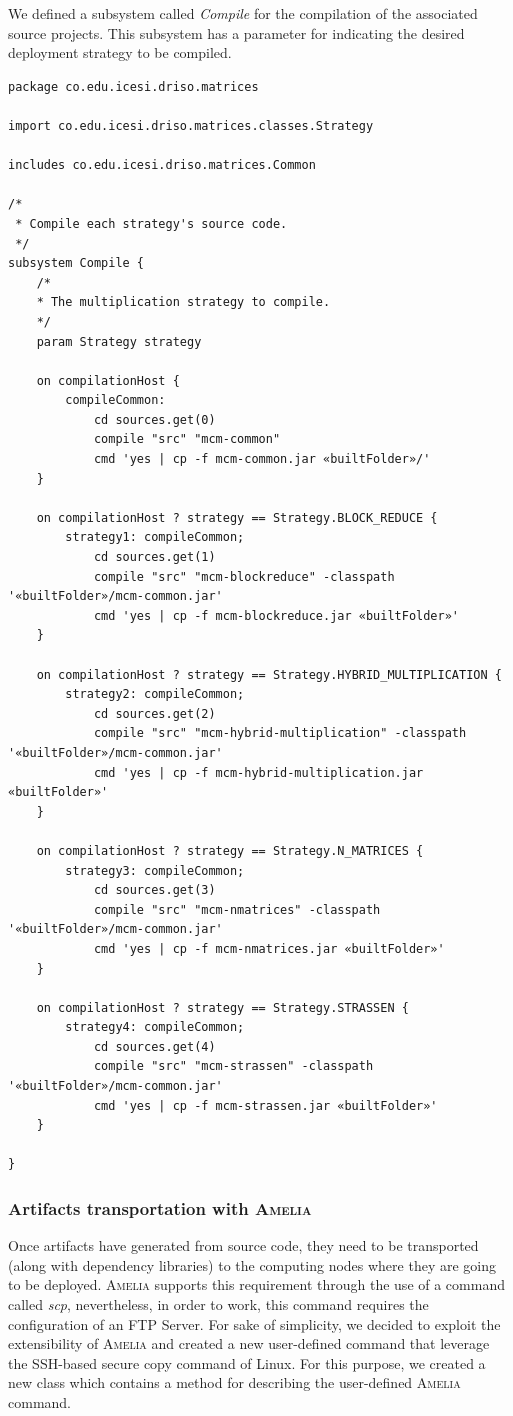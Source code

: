 \documentclass{article}
\newcommand\amelia[0]{\textsc{Amelia}}
\begin{document}
We defined a subsystem called \textit{Compile} for the compilation of the associated source projects. This subsystem has a parameter for indicating the desired deployment strategy to be compiled. \\

\begin{lstlisting}[style=amelia,caption=Subsystem \textit{Compile} for compiling the source code.]
package co.edu.icesi.driso.matrices

import co.edu.icesi.driso.matrices.classes.Strategy

includes co.edu.icesi.driso.matrices.Common

/*
 * Compile each strategy's source code.
 */
subsystem Compile {
    /*
    * The multiplication strategy to compile.
    */
	param Strategy strategy

	on compilationHost {	 
		compileCommon:
			cd sources.get(0)
			compile "src" "mcm-common"
			cmd 'yes | cp -f mcm-common.jar «builtFolder»/'
	}

	on compilationHost ? strategy == Strategy.BLOCK_REDUCE {
		strategy1: compileCommon;
			cd sources.get(1)
			compile "src" "mcm-blockreduce" -classpath '«builtFolder»/mcm-common.jar'
			cmd 'yes | cp -f mcm-blockreduce.jar «builtFolder»'
	}

	on compilationHost ? strategy == Strategy.HYBRID_MULTIPLICATION {
		strategy2: compileCommon;
			cd sources.get(2)
			compile "src" "mcm-hybrid-multiplication" -classpath '«builtFolder»/mcm-common.jar'
			cmd 'yes | cp -f mcm-hybrid-multiplication.jar «builtFolder»'
	}

	on compilationHost ? strategy == Strategy.N_MATRICES {
		strategy3: compileCommon;
			cd sources.get(3)
			compile "src" "mcm-nmatrices" -classpath '«builtFolder»/mcm-common.jar'
			cmd 'yes | cp -f mcm-nmatrices.jar «builtFolder»'
	}

	on compilationHost ? strategy == Strategy.STRASSEN {
		strategy4: compileCommon;
			cd sources.get(4)
			compile "src" "mcm-strassen" -classpath '«builtFolder»/mcm-common.jar'
			cmd 'yes | cp -f mcm-strassen.jar «builtFolder»'
	}

}

\end{lstlisting}

\subsubsection{Artifacts transportation with \amelia{}}

Once artifacts have generated from source code, they need to be transported (along with dependency libraries) to the computing nodes where they are going to be deployed. \amelia{} supports this requirement through the use of a command called \textit{scp}, nevertheless, in order to work, this command requires the configuration of an FTP Server. For sake of simplicity, we decided to exploit the extensibility of \amelia{} and created a new user-defined command that leverage the SSH-based secure copy command of Linux. For this purpose, we created a new class which contains a method for describing the user-defined \amelia{} command.
\end{document}

